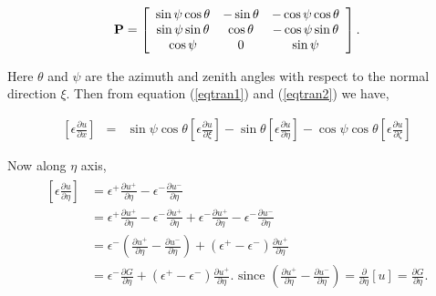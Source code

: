 \begin{align}
    \bf{P}=\left[\begin{array}{ccc}
                 \sin\psi\cos\theta  &-\sin\theta   & -\cos\psi\cos\theta \\
                \sin\psi\sin\theta   & \cos\theta   & -\cos\psi\sin\theta \\
                  \cos\psi 			 & 0 			& \sin\psi
                 \end{array}\right]. \label{eqtran2}
\end{align}

Here $\theta$ and $\psi $ are the azimuth and zenith angles with respect to the normal direction $\xi$.
Then from equation (\ref{eqtran1}) and (\ref{eqtran2}) we have, 


\begin{eqnarray}
	\left[\epsilon \frac{\partial u}{\partial x}\right] &=& \sin \psi \cos \theta \left[\epsilon \frac{\partial u}{\partial \xi}\right]-\sin \theta \left[\epsilon \frac{\partial u}{\partial \eta}\right]-\cos \psi \cos \theta \left[\epsilon \frac{\partial u}{\partial \zeta}\right]\label{3d_gfm1}
\end{eqnarray}

    Now along $\eta$ axis,
    \begin{eqnarray}
    \begin{aligned}
    	\left[\epsilon \frac{\partial u}{\partial \eta}\right] &= \epsilon^+\frac{\partial u^+}{\partial \eta }-\epsilon^-\frac{\partial u^-}{\partial \eta }\\
    	&=\epsilon^+\frac{\partial u^+}{\partial \eta }-\epsilon^-\frac{\partial u^+}{\partial \eta }+\epsilon^-\frac{\partial u^+}{\partial \eta }-\epsilon^-\frac{\partial u^-}{\partial \eta }\\
    	&= \epsilon^-\left(\frac{\partial u^+}{\partial \eta }-\frac{\partial u^-}{\partial \eta }\right)+(\epsilon^+-\epsilon^-)\frac{\partial u^+}{\partial \eta}\\
    	&= \epsilon^-\frac{\partial G}{\partial \eta}+(\epsilon^+-\epsilon^-)\frac{\partial u^+}{\partial \eta}\text{. since } \left(\frac{\partial u^+}{\partial \eta }-\frac{\partial u^-}{\partial \eta }\right)=\frac{\partial}{\partial\eta}[u]=\frac{\partial G}{\partial \eta}.\label{3d_gfm2}
    \end{aligned}
    \end{eqnarray}
    

